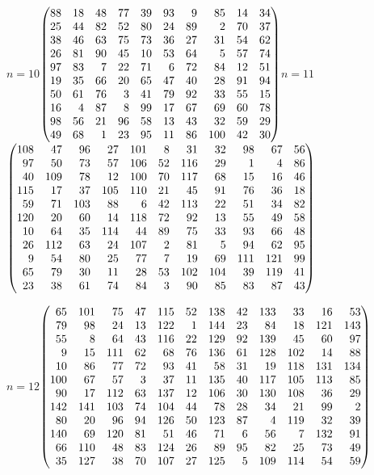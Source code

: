 {\noindent\hfill $n=10$\quad$\left(\begin{array}{@{}rrrrrrrrrr@{}}88&18&48&77&39&93&9&85&14&34\\25&44&82&52&80&24&89&2&70&37\\38&46&63&75&73&36&27&31&54&62\\26&81&90&45&10&53&64&5&57&74\\97&83&7&22&71&6&72&84&12&51\\19&35&66&20&65&47&40&28&91&94\\50&61&76&3&41&79&92&33&55&15\\16&4&87&8&99&17&67&69&60&78\\98&56&21&96&58&13&43&32&59&29\\49&68&1&23&95&11&86&100&42&30\end{array}\right)$\hfill $n=11$\quad$\left(\begin{array}{@{}rrrrrrrrrrr@{}}108&47&96&27&101&8&31&32&98&67&56\\97&50&73&57&106&52&116&29&1&4&86\\40&109&78&12&100&70&117&68&15&16&46\\115&17&37&105&110&21&45&91&76&36&18\\59&71&103&88&6&42&113&22&51&34&82\\120&20&60&14&118&72&92&13&55&49&58\\10&64&35&114&44&89&75&33&93&66&48\\26&112&63&24&107&2&81&5&94&62&95\\9&54&80&25&77&7&19&69&111&121&99\\65&79&30&11&28&53&102&104&39&119&41\\23&38&61&74&84&3&90&85&83&87&43\end{array}\right)$\hfill\null\par\medskip
\noindent\hfill $n=12$\quad$\left(\begin{array}{@{}rrrrrrrrrrrr@{}}65&101&75&47&115&52&138&42&133&33&16&53\\79&98&24&13&122&1&144&23&84&18&121&143\\55&8&64&43&116&22&129&92&139&45&60&97\\9&15&111&62&68&76&136&61&128&102&14&88\\10&86&77&72&93&41&58&31&19&118&131&134\\100&67&57&3&37&11&135&40&117&105&113&85\\90&17&112&63&137&12&106&30&130&108&36&29\\142&141&103&74&104&44&78&28&34&21&99&2\\80&20&96&94&126&50&123&87&4&119&32&39\\140&69&120&81&51&46&71&6&56&7&132&91\\66&110&48&83&124&26&89&95&82&25&73&49\\35&127&38&70&107&27&125&5&109&114&54&59\end{array}\right)$\hfill\null\par\medskip
}
